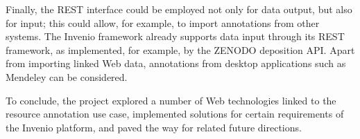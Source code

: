 Finally, the REST  interface could be employed not only for data output, but
also for input; this could allow, for example, to import annotations from other
systems. The Invenio framework already supports data input through its REST
framework, as implemented, for example, by the ZENODO deposition API. Apart
from importing linked Web  data, annotations from desktop applications such as
Mendeley can be considered.

To conclude, the project explored a number of Web technologies linked to the
resource annotation use case, implemented solutions for certain requirements of
the Invenio platform, and paved the way for related future directions.
